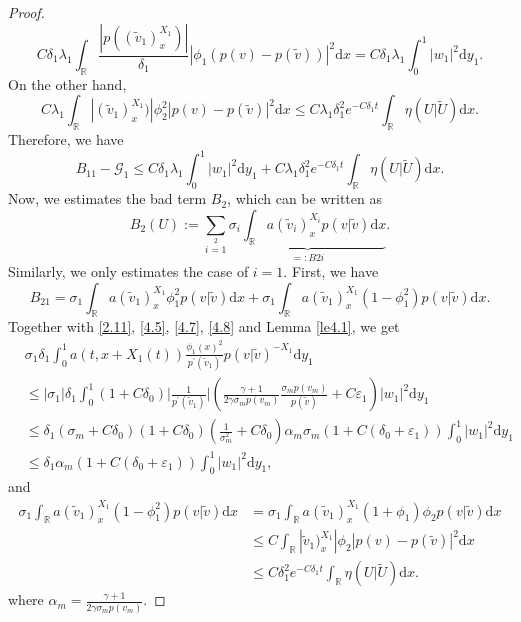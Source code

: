 \documentclass[10pt,reqno]{amsart}
\numberwithin{equation}{section}
\newcommand{\dif}{\mathrm{d}}
\begin{document}
\begin{proof}
\[
C\delta_1\lambda_1\int_\mathbb{R}\frac{|p((\widetilde{v}_1)^{X_1}_x)|}{\delta_1}|\phi_1(p(v)-p(\widetilde{v}))|^2\dif x=C\delta_1\lambda_1\int_0^1|w_1|^2\dif y_1.
\]
On the other hand,
\[
C\lambda_1\int_\mathbb{R}|(\widetilde{v}_1)^{X_1}_x)|\phi_2^2|p(v)-p(\widetilde{v})|^2\dif x
\le C\lambda_1\delta_1^2e^{-C\delta_1 t}\int_\mathbb{R}\eta(U|\widetilde{U})\dif x.
\]
Therefore, we have
\[
B_{11}-\mathcal{G}_1\le C\delta_1\lambda_1\int_0^1|w_1|^2\dif y_1+C\lambda_1\delta_1^2e^{-C\delta_1 t}\int_\mathbb{R}\eta(U|\widetilde{U})\dif x.
\]
Now, we estimates the bad term $B_2$, which can be written as
\[
B_2(U):=\sum\limits_{i=1}\limits^2
   \underbrace{\sigma_i\int_\mathbb{R}a(\widetilde{v}_i)^{X_i}_{x}p(v|\widetilde{v})\dif x}_{=:B{2i}}.
\]
Similarly, we only estimates the case of $i=1$. First, we have
\[
B_{21}=\sigma_1\int_\mathbb{R}a(\widetilde{v}_1)^{X_1}_{x}\phi_1^2p(v|\widetilde{v})\dif x
+\sigma_1\int_\mathbb{R}a(\widetilde{v}_1)^{X_1}_{x}(1-\phi_1^2)p(v|\widetilde{v})\dif x.
\]
Together with \eqref{2.11}, \eqref{4.5}, \eqref{4.7}, \eqref{4.8} and Lemma \ref{le4.1}, we get
\begin{align*}
&\sigma_1\delta_1\int_0^1a(t, x+X_1(t))\frac{\phi_1(x)^2}{p^{\prime}(\widetilde{v}_1)}
p(v|\widetilde{v})^{-X_1}\dif y_1\\
&\le |\sigma_1|\delta_1\int_0^1(1+C\delta_0)\Big|\frac{1}{p^{\prime}(\widetilde{v}_1)}\Big|
\left(\frac{\gamma+1}{2\gamma \sigma_mp(v_m)}\frac{\sigma_mp(v_m)}{ p(\widetilde{v})}+C\varepsilon_1\right)
|w_1|^2\dif y_1\\
&\le \delta_1(\sigma_m+C\delta_0)(1+C\delta_0)\left(\frac{1}{\sigma_m^2}+C\delta_0\right)
\alpha_m\sigma_m(1+C(\delta_0+\varepsilon_1))\int_0^1|w_1|^2\dif y_1\\
&\le \delta_1\alpha_m(1+C(\delta_0+\varepsilon_1))\int_0^1|w_1|^2\dif y_1,
\end{align*}
and
\begin{align*}
\sigma_1\int_\mathbb{R}a(\widetilde{v}_1)^{X_1}_{x}(1-\phi_1^2)p(v|\widetilde{v})\dif x
&=\sigma_1\int_\mathbb{R}a(\widetilde{v}_1)^{X_1}_{x}(1+\phi_1)\phi_2p(v|\widetilde{v})\dif x\\
&\le C\int_\mathbb{R}|\widetilde{v}_1)^{X_1}_{x}|\phi_2|p(v)-p(\widetilde{v})|^2\dif x\\
&\le C\delta_1^2e^{-C\delta_1 t}\int_\mathbb{R}\eta(U|\widetilde{U})\dif x.
\end{align*}
where $\alpha_m=\frac{\gamma+1}{2\gamma\sigma_m p(v_m)}$.


\end{proof}
\end{document}
